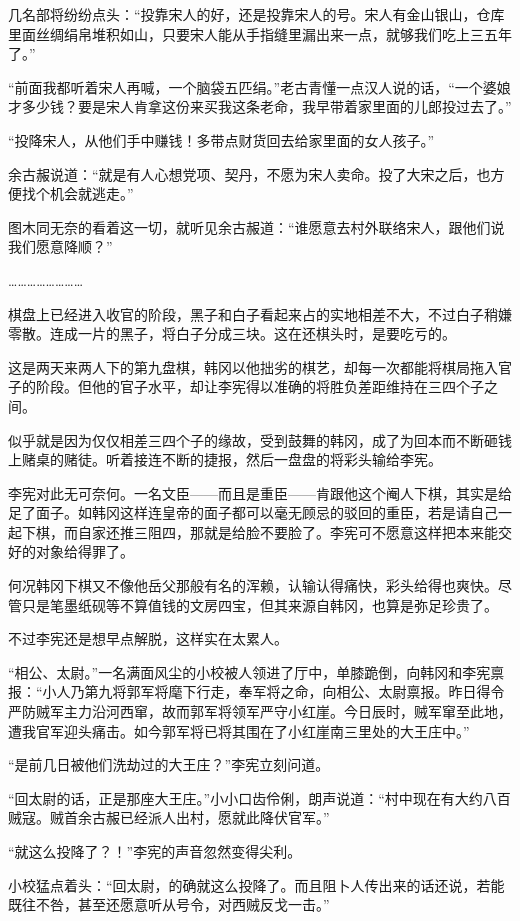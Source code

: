 几名部将纷纷点头：“投靠宋人的好，还是投靠宋人的号。宋人有金山银山，仓库里面丝绸绢帛堆积如山，只要宋人能从手指缝里漏出来一点，就够我们吃上三五年了。”

“前面我都听着宋人再喊，一个脑袋五匹绢。”老古青懂一点汉人说的话，“一个婆娘才多少钱？要是宋人肯拿这份来买我这条老命，我早带着家里面的儿郎投过去了。”

“投降宋人，从他们手中赚钱！多带点财货回去给家里面的女人孩子。”

余古赧说道：“就是有人心想党项、契丹，不愿为宋人卖命。投了大宋之后，也方便找个机会就逃走。”

图木同无奈的看着这一切，就听见余古赧道：“谁愿意去村外联络宋人，跟他们说我们愿意降顺？”

……………………

棋盘上已经进入收官的阶段，黑子和白子看起来占的实地相差不大，不过白子稍嫌零散。连成一片的黑子，将白子分成三块。这在还棋头时，是要吃亏的。

这是两天来两人下的第九盘棋，韩冈以他拙劣的棋艺，却每一次都能将棋局拖入官子的阶段。但他的官子水平，却让李宪得以准确的将胜负差距维持在三四个子之间。

似乎就是因为仅仅相差三四个子的缘故，受到鼓舞的韩冈，成了为回本而不断砸钱上赌桌的赌徒。听着接连不断的捷报，然后一盘盘的将彩头输给李宪。

李宪对此无可奈何。一名文臣——而且是重臣——肯跟他这个阉人下棋，其实是给足了面子。如韩冈这样连皇帝的面子都可以毫无顾忌的驳回的重臣，若是请自己一起下棋，而自家还推三阻四，那就是给脸不要脸了。李宪可不愿意这样把本来能交好的对象给得罪了。

何况韩冈下棋又不像他岳父那般有名的浑赖，认输认得痛快，彩头给得也爽快。尽管只是笔墨纸砚等不算值钱的文房四宝，但其来源自韩冈，也算是弥足珍贵了。

不过李宪还是想早点解脱，这样实在太累人。

“相公、太尉。”一名满面风尘的小校被人领进了厅中，单膝跪倒，向韩冈和李宪禀报：“小人乃第九将郭军将麾下行走，奉军将之命，向相公、太尉禀报。昨日得令严防贼军主力沿河西窜，故而郭军将领军严守小红崖。今日辰时，贼军窜至此地，遭我官军迎头痛击。如今郭军将已将其围在了小红崖南三里处的大王庄中。”

“是前几日被他们洗劫过的大王庄？”李宪立刻问道。

“回太尉的话，正是那座大王庄。”小小口齿伶俐，朗声说道：“村中现在有大约八百贼寇。贼首余古赧已经派人出村，愿就此降伏官军。”

“就这么投降了？！”李宪的声音忽然变得尖利。

小校猛点着头：“回太尉，的确就这么投降了。而且阻卜人传出来的话还说，若能既往不咎，甚至还愿意听从号令，对西贼反戈一击。”

